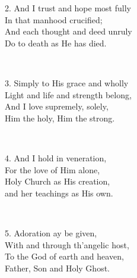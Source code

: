 
\renewcommand{\betweenLilyPondSystem}[1]{\par}

\hskip30mm
\begin{minipage}{77mm}
\hskip-3pt 2. And I trust and hope most fully\\
In that manhood crucified;\\
And each thought and deed unruly\\
Do to death as He has died.

~

\hskip-3pt 3. Simply to His grace and wholly\\
Light and life and strength belong,\\
And I love supremely, solely,\\
Him the holy, Him the strong.

~

\hskip-3pt 4. And I hold in veneration,\\
For the love of Him alone,\\
Holy Church as His creation,\\
and her teachings as His own.

~

\hskip-3pt 5. Adoration ay be given,\\
With and through th’angelic host,\\
To the God of earth and heaven,\\
Father, Son and Holy Ghost.
\end{minipage}

\bigskip


\renewcommand{\betweenLilyPondSystem}[1]{\linebreak}
